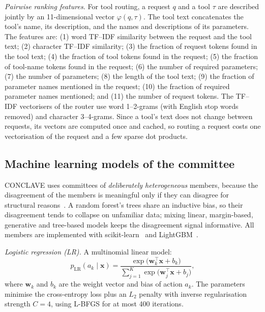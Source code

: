 \documentclass[journal]{IEEEtran}
\begin{document}
\textit{Pairwise ranking features.} For tool routing, a request $q$ and a tool
$\tau$ are described jointly by an 11-dimensional vector $\varphi(q,\tau)$. The
tool text concatenates the tool's name, its description, and the names and
descriptions of its parameters. The features are: (1) word TF--IDF similarity
between the request and the tool text; (2) character TF--IDF similarity; (3) the
fraction of request tokens found in the tool text; (4) the fraction of tool
tokens found in the request; (5) the fraction of tool-name tokens found in the
request; (6) the number of required parameters; (7) the number of parameters;
(8) the length of the tool text; (9) the fraction of parameter names mentioned
in the request; (10) the fraction of required parameter names mentioned; and
(11) the number of request tokens. The TF--IDF vectorisers of the router use
word 1--2-grams (with English stop words removed) and character 3--4-grams.
Since a tool's text does not change between requests, its vectors are
computed once and cached, so routing a request costs one vectorisation of the
request and a few sparse dot products.

\subsection{Machine learning models of the committee}\label{sec:models}
CONCLAVE uses committees of \emph{deliberately heterogeneous} members, because
the disagreement of the members is meaningful only if they can disagree for
structural reasons~\cite{dietterich2000ensemble}. A random forest's trees share
an inductive bias, so their disagreement tends to collapse on unfamiliar data;
mixing linear, margin-based, generative and tree-based models keeps the
disagreement signal informative. All members are implemented with
scikit-learn~\cite{pedregosa2011sklearn} and LightGBM~\cite{ke2017lightgbm}.

\textit{Logistic regression (LR).} A multinomial linear model:
\begin{equation}
p_{\mathrm{LR}}(a_k\mid\mathbf{x})=
\frac{\exp\!\big(\mathbf{w}_k^{\top}\mathbf{x}+b_k\big)}
{\sum_{j=1}^{K}\exp\!\big(\mathbf{w}_j^{\top}\mathbf{x}+b_j\big)},
\label{eq:lr}
\end{equation}
where $\mathbf{w}_k$ and $b_k$ are the weight vector and bias of action $a_k$.
The parameters minimise the cross-entropy loss plus an $L_2$ penalty with
inverse regularisation strength $C=4$, using L-BFGS for at most 400 iterations.
\end{document}
